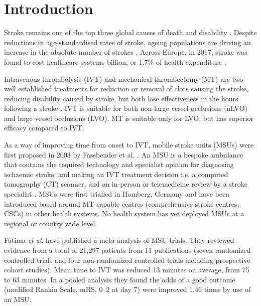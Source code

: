 \section{Introduction}


Stroke remains one of the top three global causes of death and disability \cite{feigin_global_2021}. Despite reductions in age-standardised rates of stroke, ageing populations are driving an increase in the absolute number of strokes \cite{feigin_global_2021}. Across Europe, in 2017, stroke was found to cost healthcare systems  billion, or 1.7\% of health expenditure \cite{luengo-fernandez_economic_2020}.

Intravenous thrombolysis (IVT) and mechanical thrombectomy (MT) are two well established treatments for reduction or removal of clots causing the stroke, reducing disability caused by stroke, but both lose effectiveness in the hours following a stroke \cite{emberson_effect_2014, fransen_time_2016}. IVT is suitable for both non-large vessel occlusions (nLVO) and large vessel occlusions (LVO). MT is suitable only for LVO, but has superior efficacy compared to IVT.


As a way of improving time from onset to IVT, mobile stroke units (MSUs) were first proposed in 2003 by Fassbender et al. \cite{fassbender_mobile_2003}. An MSU is a bespoke ambulance that contains the required technology and specialist opinion for diagnosing ischaemic stroke, and making an IVT treatment decision i.e. a computed tomography (CT) scanner, and an in-person or telemedicine review by a stroke specialist \cite{taqui_reduction_2017}. MSUs were first trialled in Homberg, Germany \cite{walter_diagnosis_2012} and have been introduced based around MT-capable centres (comprehensive stroke centres, CSCs)  in other health systems. No health system has yet deployed MSUs at a regional or country wide level.

Fatima \textit{et al}. \cite{fatima_mobile_2020} have published a meta-analysis of MSU trials. They reviewed evidence from a total of 21,297 patients from 11 publications (seven randomized controlled trials and four non-randomized controlled trials including prospective cohort studies). Mean time to IVT was reduced 13 minutes on average, from 75 to 63 minutes. In a pooled analysis they found the odds of a good outcome (modified Rankin Scale, mRS, 0–2 at day 7) were improved 1.46 times by use of an MSU.

